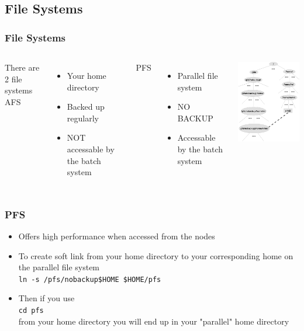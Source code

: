 \subsection{File Systems}

\begin{frame}
	\frametitle{File Systems}


\begin{columns}
	\column[T]{5cm}
		There are 2 file systems\\
		AFS
		\begin{itemize}
			\item	Your home directory
			\item	Backed up regularly
			\item	NOT accessable by the batch system
		\end{itemize}
		PFS
		\begin{itemize}
			\item	Parallel file system
			\item	NO BACKUP
			\item	Accessable by the batch system
		\end{itemize}
	\column[T]{5cm}
		\vspace*{-1cm}
		\includegraphics[width=6.5cm]{images/filesystem.eps}
\end{columns}
\end{frame}

\begin{frame}
    \frametitle{PFS}

	\begin{itemize}
		\item	Offers high performance when accessed from the nodes
		\item	To create soft link from your home directory to your
				corresponding home on the parallel file system\\
				\texttt{ln~-s~/pfs/nobackup\$HOME~\$HOME/pfs}
		\item	Then if you use\\
				\texttt{cd pfs}\\
				from your home directory
				you will end up in your "parallel" home directory
				
	\end{itemize}
	
\end{frame}


